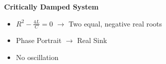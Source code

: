 \documentclass[preview]{standalone}
\begin{document}
\begin{center}
\textbf{Critically Damped System}
                    \begin{itemize}
                        \item $R^2 - \frac{4L}{C} = 0$ $\rightarrow$ Two equal, negative real roots
                        \item Phase Portrait $\rightarrow$ Real Sink
                     \item No oscillation
                    \end{itemize}
\end{center}
\end{document}
